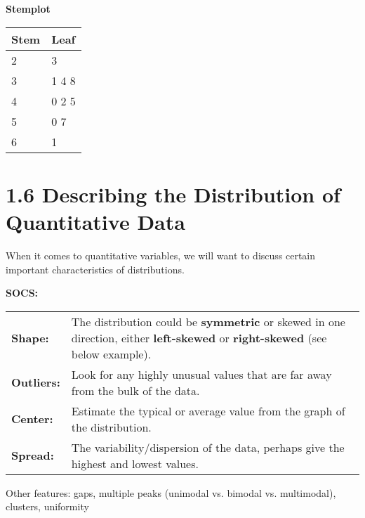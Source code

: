 \textbf{Stemplot}
\begin{center}
\begin{tabular}{ll}
\textbf{Stem} & \textbf{Leaf} \\
\hline
2 & 3 \\
3 & 1 4 8 \\
4 & 0 2 5 \\
5 & 0 7 \\
6 & 1 \\
\end{tabular}
\end{center}
\bigskip


\section*{1.6 Describing the Distribution of Quantitative Data}
When it comes to quantitative variables, we will want to discuss certain important characteristics of distributions.
\begin{tcolorbox}[title=Key Terms, colback=blue!5!white, colframe=blue!75!black, breakable]
\begin{flushleft}
\textbf{SOCS:}
\par\medskip
\hspace*{1em}
\begin{tabular}{@{} l p{} @{}}
  \textbf{Shape:} & The distribution could be \textbf{symmetric} or skewed in one direction, either \textbf{left-skewed} or \textbf{right-skewed} (see below example). \\
  \textbf{Outliers:} & Look for any highly unusual values that are far away from the bulk of the data. \\
  \textbf{Center:} & Estimate the typical or average value from the graph of the distribution. \\
  \textbf{Spread:} & The variability/dispersion of the data, perhaps give the highest and lowest values. \\
\end{tabular}
\end{flushleft}
\end{tcolorbox}
Other features: gaps, multiple peaks (unimodal vs. bimodal vs. multimodal), clusters, uniformity \\
\par\medskip

